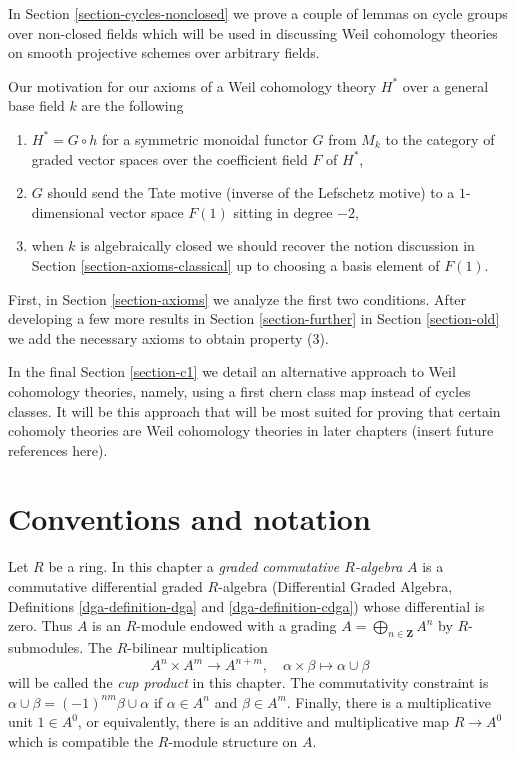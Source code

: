 \medskip\noindent
In Section \ref{section-cycles-nonclosed} we prove a couple of lemmas
on cycle groups over non-closed fields which will be used in discussing
Weil cohomology theories on smooth projective schemes over arbitrary fields.

\medskip\noindent
Our motivation for our axioms of a Weil cohomology theory $H^*$
over a general base field $k$ are the following
\begin{enumerate}
\item $H^* = G \circ h$ for a symmetric monoidal functor $G$ from $M_k$
to the category of graded vector spaces over the coefficient field $F$ of $H^*$,
\item $G$ should send the Tate motive (inverse of the Lefschetz motive)
to a $1$-dimensional vector space $F(1)$ sitting in degree $-2$,
\item when $k$ is algebraically closed we should recover the notion
discussion in Section \ref{section-axioms-classical}
up to choosing a basis element of $F(1)$.
\end{enumerate}
First, in Section \ref{section-axioms} we analyze the first two conditions.
After developing a few more results in Section \ref{section-further}
in Section \ref{section-old} we add the necessary axioms to obtain
property (3).

\medskip\noindent
In the final Section \ref{section-c1} we detail an alternative approach
to Weil cohomology theories, namely, using a first chern class map
instead of cycles classes. It will be this approach that will be most
suited for proving that certain cohomoly theories are Weil cohomology
theories in later chapters (insert future references here).





\section{Conventions and notation}
\label{section-conventions}

\noindent
Let $R$ be a ring. In this chapter a
{\it graded commutative $R$-algebra} $A$ is a
commutative differential graded $R$-algebra
(Differential Graded Algebra, Definitions \ref{dga-definition-dga} and
\ref{dga-definition-cdga}) whose differential is zero. Thus $A$
is an $R$-module endowed with a grading
$A = \bigoplus_{n \in \mathbf{Z}} A^n$ by
$R$-submodules. The $R$-bilinear multiplication
$$
A^n \times A^m \longrightarrow A^{n + m},\quad
\alpha \times \beta \longmapsto \alpha \cup \beta
$$
will be called the {\it cup product} in this chapter.
The commutativity constraint is
$\alpha \cup \beta = (-1)^{nm} \beta \cup \alpha$ if
$\alpha \in A^n$ and $\beta \in A^m$. Finally, there is
a multiplicative unit $1 \in A^0$, or equivalently, there is an
additive and multiplicative map $R \to A^0$ which is compatible the
$R$-module structure on $A$.

